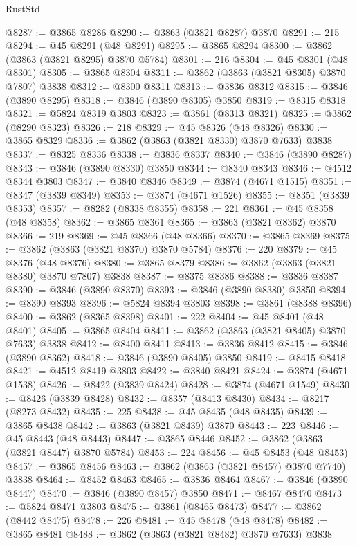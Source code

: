 \begin{lexlean}{RustStd}
\begin{coremodule}
@8287 := @3865 @8286
@8290 := @3863 (@3821 @8287) @3870
@8291 := 215
@8294 := @45 @8291 (@48 @8291)
@8295 := @3865 @8294
@8300 := @3862 (@3863 (@3821 @8295) @3870 @5784)
@8301 := 216
@8304 := @45 @8301 (@48 @8301)
@8305 := @3865 @8304
@8311 := @3862 (@3863 (@3821 @8305) @3870 @7807) @3838
@8312 := @8300 @8311
@8313 := @3836 @8312
@8315 := @3846 (@3890 @8295)
@8318 := @3846 (@3890 @8305) @3850
@8319 := @8315 @8318
@8321 := @5824 @8319 @3803
@8323 := @3861 (@8313 @8321)
@8325 := @3862 (@8290 @8323)
@8326 := 218
@8329 := @45 @8326 (@48 @8326)
@8330 := @3865 @8329
@8336 := @3862 (@3863 (@3821 @8330) @3870 @7633) @3838
@8337 := @8325 @8336
@8338 := @3836 @8337
@8340 := @3846 (@3890 @8287)
@8343 := @3846 (@3890 @8330) @3850
@8344 := @8340 @8343
@8346 := @4512 @8344 @3803
@8347 := @3840 @8346
@8349 := @3874 (@4671 @1515)
@8351 := @8347 (@3839 @8349)
@8353 := @3874 (@4671 @1526)
@8355 := @8351 (@3839 @8353)
@8357 := @8282 (@8338 @8355)
@8358 := 221
@8361 := @45 @8358 (@48 @8358)
@8362 := @3865 @8361
@8365 := @3863 (@3821 @8362) @3870
@8366 := 219
@8369 := @45 @8366 (@48 @8366)
@8370 := @3865 @8369
@8375 := @3862 (@3863 (@3821 @8370) @3870 @5784)
@8376 := 220
@8379 := @45 @8376 (@48 @8376)
@8380 := @3865 @8379
@8386 := @3862 (@3863 (@3821 @8380) @3870 @7807) @3838
@8387 := @8375 @8386
@8388 := @3836 @8387
@8390 := @3846 (@3890 @8370)
@8393 := @3846 (@3890 @8380) @3850
@8394 := @8390 @8393
@8396 := @5824 @8394 @3803
@8398 := @3861 (@8388 @8396)
@8400 := @3862 (@8365 @8398)
@8401 := 222
@8404 := @45 @8401 (@48 @8401)
@8405 := @3865 @8404
@8411 := @3862 (@3863 (@3821 @8405) @3870 @7633) @3838
@8412 := @8400 @8411
@8413 := @3836 @8412
@8415 := @3846 (@3890 @8362)
@8418 := @3846 (@3890 @8405) @3850
@8419 := @8415 @8418
@8421 := @4512 @8419 @3803
@8422 := @3840 @8421
@8424 := @3874 (@4671 @1538)
@8426 := @8422 (@3839 @8424)
@8428 := @3874 (@4671 @1549)
@8430 := @8426 (@3839 @8428)
@8432 := @8357 (@8413 @8430)
@8434 := @8217 (@8273 @8432)
@8435 := 225
@8438 := @45 @8435 (@48 @8435)
@8439 := @3865 @8438
@8442 := @3863 (@3821 @8439) @3870
@8443 := 223
@8446 := @45 @8443 (@48 @8443)
@8447 := @3865 @8446
@8452 := @3862 (@3863 (@3821 @8447) @3870 @5784)
@8453 := 224
@8456 := @45 @8453 (@48 @8453)
@8457 := @3865 @8456
@8463 := @3862 (@3863 (@3821 @8457) @3870 @7740) @3838
@8464 := @8452 @8463
@8465 := @3836 @8464
@8467 := @3846 (@3890 @8447)
@8470 := @3846 (@3890 @8457) @3850
@8471 := @8467 @8470
@8473 := @5824 @8471 @3803
@8475 := @3861 (@8465 @8473)
@8477 := @3862 (@8442 @8475)
@8478 := 226
@8481 := @45 @8478 (@48 @8478)
@8482 := @3865 @8481
@8488 := @3862 (@3863 (@3821 @8482) @3870 @7633) @3838

\end{coremodule}
\end{lexlean}
